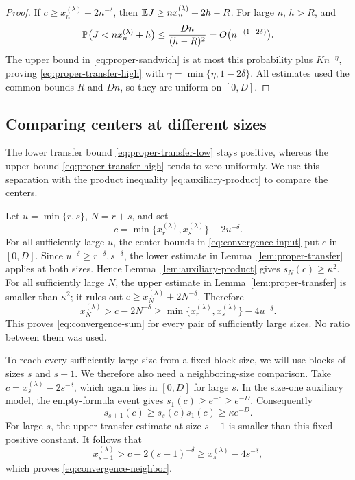 \begin{proof}
If \(c\ge x_n^{(\lambda)}+2n^{-\delta}\), then
\(\mathbb E J\ge nx_n^{(\lambda)}+2h-R\).  For large \(n\), \(h>R\), and
\[
 \mathbb P\bigl(J<nx_n^{(\lambda)}+h\bigr)
 \le\frac{Dn}{(h-R)^2}=O\bigl(n^{-(1-2\delta)}\bigr).
\]
The upper bound in \eqref{eq:proper-sandwich} is at most this probability
plus \(Kn^{-\eta}\), proving \eqref{eq:proper-transfer-high} with
\(\gamma=\min\{\eta,1-2\delta\}\).  All estimates used the common
bounds \(R\) and \(Dn\), so they are uniform on \([0,D]\).
\end{proof}

\subsection{Comparing centers at different sizes}

The lower transfer bound \eqref{eq:proper-transfer-low} stays positive,
whereas the upper bound \eqref{eq:proper-transfer-high} tends to zero
uniformly.  We use this separation with the product inequality
\eqref{eq:auxiliary-product} to compare the centers.

Let \(u=\min\{r,s\}\), \(N=r+s\), and set
\[
 c=\min\{x_r^{(\lambda)},x_s^{(\lambda)}\}-2u^{-\delta}.
\]
For all sufficiently large \(u\), the center bounds in
\eqref{eq:convergence-input} put \(c\) in \([0,D]\).  Since
\(u^{-\delta}\ge r^{-\delta},s^{-\delta}\), the lower estimate in
Lemma~\ref{lem:proper-transfer} applies at both sizes.  Hence
Lemma~\ref{lem:auxiliary-product} gives \(s_N(c)\ge\kappa^2\).
For all sufficiently large \(N\), the upper estimate in
Lemma~\ref{lem:proper-transfer} is smaller than \(\kappa^2\); it rules
out \(c\ge x_N^{(\lambda)}+2N^{-\delta}\).  Therefore
\[
 x_N^{(\lambda)}>c-2N^{-\delta}
 \ge\min\{x_r^{(\lambda)},x_s^{(\lambda)}\}-4u^{-\delta}.
\]
This proves \eqref{eq:convergence-sum} for every pair of sufficiently
large sizes.  No ratio between them was used.

To reach every sufficiently large size from a fixed block size, we will
use blocks of sizes \(s\) and \(s+1\).  We therefore also need a
neighboring-size comparison.  Take
\(c=x_s^{(\lambda)}-2s^{-\delta}\), which again lies in \([0,D]\)
for large \(s\).  In the size-one auxiliary model, the empty-formula
event gives \(s_1(c)\ge e^{-c}\ge e^{-D}\).  Consequently
\[
 s_{s+1}(c)\ge s_s(c)s_1(c)\ge\kappa e^{-D}.
\]
For large \(s\), the upper transfer estimate at size \(s+1\) is smaller
than this fixed positive constant.  It follows that
\[
 x_{s+1}^{(\lambda)}>c-2(s+1)^{-\delta}
 \ge x_s^{(\lambda)}-4s^{-\delta},
\]
which proves \eqref{eq:convergence-neighbor}.

